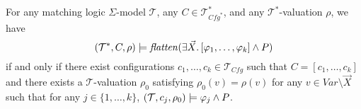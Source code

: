 \begin{lemma}[On Flattening]\label{lem:flatten}
    For any matching logic $\Sigma$-model $\mathcal{T}$, any $C \in \mathcal{T}^*_{\mathit{Cfg}^*}$,
    and any $\mathcal{T}^*$-valuation $\rho$, we have
        \begin{equation*}
            (\mathcal{T}^*, C, \rho) \models \mathit{flatten}(\exists \vec{X}.\, [\varphi_1,\ldots,\varphi_k] \land P)
        \end{equation*}
    if and only if
        there exist configurations $c_1, \ldots, c_k \in \mathcal{T}_{\mathit{Cfg}}$ such that
        $C = [c_1, \ldots, c_k]$ and there exists a $\mathcal{T}$-valuation $\rho_0$
        satisfying $\rho_0(v) = \rho(v)$ for any $v \in \mathit{Var} \setminus \vec{X}$
        such that for any $j \in \{ 1, \ldots, k \}$,
        $(\mathcal{T}, c_j, \rho_0) \models \varphi_j \land P$.
\end{lemma}



